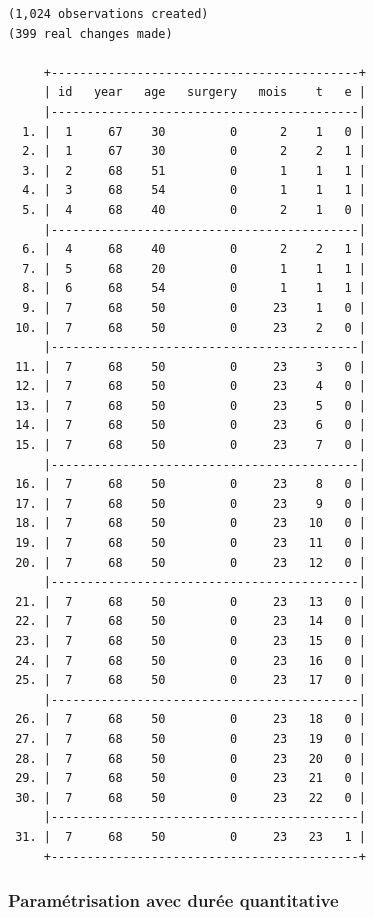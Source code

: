 \documentclass[
  12pt,
  letterpaper,
  DIV=11,
  numbers=noendperiod,
  onepage,
  openany]{scrreprt}
\begin{document}
\begin{verbatim}
(1,024 observations created)
(399 real changes made)

     +-------------------------------------------+
     | id   year   age   surgery   mois    t   e |
     |-------------------------------------------|
  1. |  1     67    30         0      2    1   0 |
  2. |  1     67    30         0      2    2   1 |
  3. |  2     68    51         0      1    1   1 |
  4. |  3     68    54         0      1    1   1 |
  5. |  4     68    40         0      2    1   0 |
     |-------------------------------------------|
  6. |  4     68    40         0      2    2   1 |
  7. |  5     68    20         0      1    1   1 |
  8. |  6     68    54         0      1    1   1 |
  9. |  7     68    50         0     23    1   0 |
 10. |  7     68    50         0     23    2   0 |
     |-------------------------------------------|
 11. |  7     68    50         0     23    3   0 |
 12. |  7     68    50         0     23    4   0 |
 13. |  7     68    50         0     23    5   0 |
 14. |  7     68    50         0     23    6   0 |
 15. |  7     68    50         0     23    7   0 |
     |-------------------------------------------|
 16. |  7     68    50         0     23    8   0 |
 17. |  7     68    50         0     23    9   0 |
 18. |  7     68    50         0     23   10   0 |
 19. |  7     68    50         0     23   11   0 |
 20. |  7     68    50         0     23   12   0 |
     |-------------------------------------------|
 21. |  7     68    50         0     23   13   0 |
 22. |  7     68    50         0     23   14   0 |
 23. |  7     68    50         0     23   15   0 |
 24. |  7     68    50         0     23   16   0 |
 25. |  7     68    50         0     23   17   0 |
     |-------------------------------------------|
 26. |  7     68    50         0     23   18   0 |
 27. |  7     68    50         0     23   19   0 |
 28. |  7     68    50         0     23   20   0 |
 29. |  7     68    50         0     23   21   0 |
 30. |  7     68    50         0     23   22   0 |
     |-------------------------------------------|
 31. |  7     68    50         0     23   23   1 |
     +-------------------------------------------+
\end{verbatim}

\hypertarget{paramuxe9trisation-avec-duruxe9e-quantitative}{%
\subsubsection{Paramétrisation avec durée
quantitative}\label{paramuxe9trisation-avec-duruxe9e-quantitative}}
\end{document}
